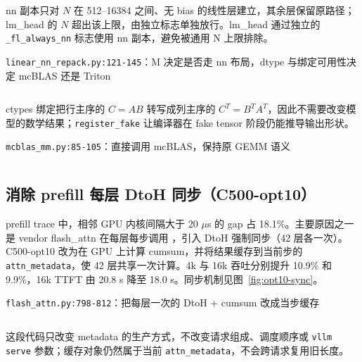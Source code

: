 \documentclass[11pt,a4paper]{ctexart}
\newcommand{\PluginCode}{../pkg_build/XLANG2026/vllm-plugin-FL}%
\newcommand{\PluginCode}{../../XLANG2026/vllm-plugin-FL}%
\begin{document}
nn 副本只对 $N$ 在 512--16384 之间、无 bias 的线性层建立，其余层保留原路径；lm\_head 的 $N$ 超出该上限，由独立标志单独放行。lm\_head 通过独立的 \texttt{\_fl\_always\_nn} 标志使用 nn 副本，避免被通用 N 上限排除。

\begin{reportcode}{\texttt{linear\_nn\_repack.py:121-145}：M 决定是否走 nn 布局，dtype 与绑定可用性决定 mcBLAS 还是 Triton}
\inputminted[linenos,fontsize=\scriptsize,breaklines,tabsize=4,firstline=121,lastline=145]{python}{\PluginCode/vllm_fl/dispatch/backends/vendor/metax/patches/linear_nn_repack.py}
\end{reportcode}

ctypes 绑定把行主序的 $C=A B$ 转写成列主序的 $C^T=B^T A^T$，因此不需要改变模型的数学结果；\texttt{register\_fake} 让编译器在 fake tensor 阶段仍能推导输出形状。

\begin{reportcode}{\texttt{mcblas\_mm.py:85-105}：直接调用 mcBLAS，保持原 GEMM 语义}
\inputminted[linenos,fontsize=\scriptsize,breaklines,tabsize=4,firstline=85,lastline=105]{python}{\PluginCode/vllm_fl/dispatch/backends/vendor/metax/patches/mcblas_mm.py}
\end{reportcode}

\subsection{消除 prefill 每层 DtoH 同步（C500-opt10）}\label{sec:c500-sync}
prefill trace 中，相邻 GPU 内核间隔大于 20 $\mu$s 的 gap 占 18.1\%。主要原因之一是 vendor flash\_attn 在每层每步调用 ，引入 DtoH 强制同步（42 层各一次）。C500-opt10 改为在 GPU 上计算 cumsum，并将结果缓存到当前步的 \texttt{attn\_metadata}，使 42 层共享一次计算。4k 与 16k 吞吐分别提升 10.9\% 和 9.9\%，16k TTFT 由 20.8 s 降至 18.0 s。同步机制见图~\ref{fig:opt10-sync}。

\begin{reportcode}{\texttt{flash\_attn.py:798-812}：把每层一次的 DtoH + cumsum 改成当步缓存}
\inputminted[linenos,fontsize=\scriptsize,breaklines,tabsize=4,firstline=798,lastline=812]{python}{\PluginCode/vllm_fl/dispatch/backends/vendor/metax/impl/attention/flash_attn.py}
\end{reportcode}

这段代码只改变 metadata 的生产方式，不改变请求组成、调度顺序或 \texttt{vllm serve} 参数；缓存对象仍然属于当前 \texttt{attn\_metadata}，不会跨请求复用旧长度。
\end{document}

